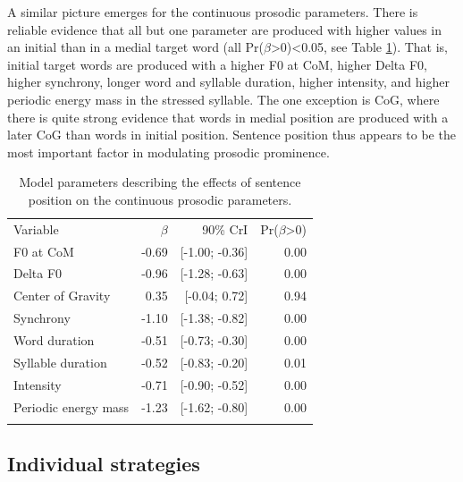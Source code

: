 A similar picture emerges for the continuous prosodic parameters. There is reliable evidence that all but one parameter are produced with higher values in an initial than in a medial target word (all Pr($\beta$\textgreater{}0)\textless{}0.05, see Table \ref{table:model_parameters_position}). That is, initial target words are produced with a higher F0 at CoM, higher Delta F0, higher synchrony, longer word and syllable duration, higher intensity, and higher periodic energy mass in the stressed syllable. The one exception is CoG, where there is quite strong evidence that words in medial position are produced with a later CoG than words in initial position. Sentence position thus appears to be the most important factor in modulating prosodic prominence.

\begin{table}[]
\begin{tabular}{lrrr}
\lsptoprule
\multicolumn{4}{c}{Sentence position} \\ \hline
Variable    & $\beta$ & 90\% CrI  & Pr($\beta$\textgreater{}0) \\ \hline
F0 at CoM    & -0.69       & {[}-1.00; -0.36{]}  & 0.00                          \\
Delta F0    & -0.96       & {[}-1.28; -0.63{]}  & 0.00                          \\
Center of Gravity            & 0.35       & {[}-0.04; 0.72{]}  & 0.94                          \\
Synchrony            & -1.10       & {[}-1.38; -0.82{]}  & 0.00                          \\
Word duration            & -0.51       & {[}-0.73; -0.30{]}  & 0.00                          \\
Syllable duration & -0.52       & {[}-0.83; -0.20{]}  & 0.01                             \\
Intensity             & -0.71       & {[}-0.90; -0.52{]} & 0.00                          \\
Periodic energy mass         & -1.23       & {[}-1.62; -0.80{]} & 0.00                          \\
\lspbottomrule
\end{tabular}
\caption{Model parameters describing the effects of sentence position on the continuous prosodic parameters.}
\label{table:model_parameters_position}
\end{table}

\subsection{Individual strategies}

